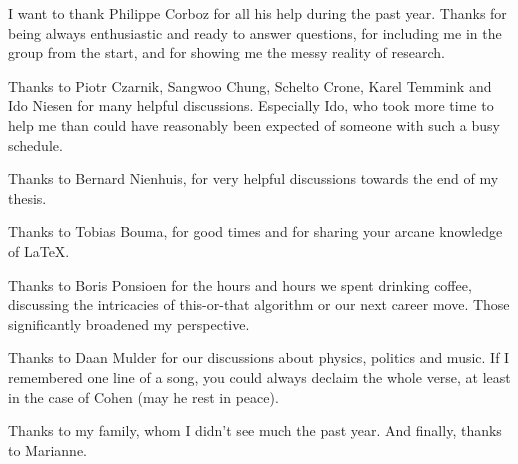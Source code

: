 I want to thank Philippe Corboz for all his help during the past year.
Thanks for being always enthusiastic and ready to answer questions, for including me in the group from the start,
and for showing me the messy reality of research.

Thanks to Piotr Czarnik, Sangwoo Chung, Schelto Crone, Karel Temmink and Ido Niesen for many helpful discussions.
Especially Ido, who took more time to help me than could have reasonably been expected of someone with such a busy
schedule.

Thanks to Bernard Nienhuis, for very helpful discussions towards the end of my thesis.

Thanks to Tobias Bouma, for good times and for sharing your arcane knowledge of LaTeX.

Thanks to Boris Ponsioen for the hours and hours we spent drinking coffee,
discussing the intricacies of this-or-that algorithm or our next career move.
Those significantly broadened my perspective.

Thanks to Daan Mulder for our discussions about physics, politics and music.
If I remembered one line of a song, you could always declaim the whole verse,
at least in the case of Cohen (may he rest in peace).

Thanks to my family, whom I didn't see much the past year. And finally, thanks to Marianne.
